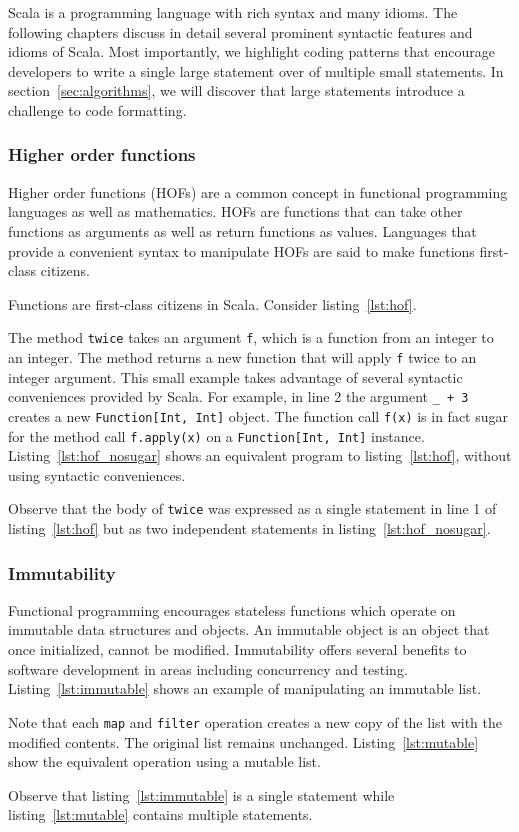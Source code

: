 Scala is a programming language with rich syntax and many idioms.
The following chapters discuss in detail several prominent syntactic features and idioms of Scala.
Most importantly, we highlight coding patterns that encourage developers to write a single large statement over of multiple small statements.
In section~\ref{sec:algorithms}, we will discover that large statements introduce a challenge to code formatting.

\subsubsection{Higher order functions}
Higher order functions (HOFs) are a common concept in functional programming languages as well as mathematics.
HOFs are functions that can take other functions as arguments as well as return functions as values.
Languages that provide a convenient syntax to manipulate HOFs are said to make functions first-class citizens.

Functions are first-class citizens in Scala.
Consider listing~\ref{lst:hof}.

The method \texttt{twice} takes an argument \texttt{f}, which is a function from an integer to an integer.
The method returns a new function that will apply \texttt{f} twice to an integer argument.
This small example takes advantage of several syntactic conveniences provided by Scala.
For example, in line 2 the argument \texttt{\_ + 3} creates a new \texttt{Function[Int, Int]} object.
The function call \texttt{f(x)} is in fact sugar for the method call \texttt{f.apply(x)} on a \texttt{Function[Int, Int]} instance.
Listing~\ref{lst:hof_nosugar} shows an equivalent program to listing~\ref{lst:hof}, without using syntactic conveniences.

Observe that the body of \texttt{twice} was expressed as a single statement in line 1 of listing~\ref{lst:hof} but as two independent statements in listing~\ref{lst:hof_nosugar}.

\subsubsection{Immutability}
Functional programming encourages stateless functions which operate on immutable data structures and objects.
An immutable object is an object that once initialized, cannot be modified.
Immutability offers several benefits to software development in areas including concurrency and testing.
Listing~\ref{lst:immutable} shows an example of manipulating an immutable list.

Note that each \texttt{map} and \texttt{filter} operation creates a new copy of the list with the modified contents.
The original list remains unchanged.
Listing~\ref{lst:mutable} show the equivalent operation using a mutable list.

Observe that listing~\ref{lst:immutable} is a single statement while listing~\ref{lst:mutable} contains multiple statements.

